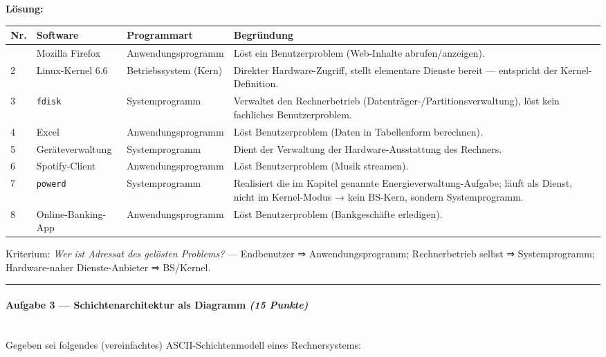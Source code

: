 \documentclass[11pt, a4paper]{article}
\begin{document}
\textbf{Lösung:}



{\small
\begin{tabularx}{\linewidth}{XXXX}
\hline
\rowcolor{tableheadbg}
{\color{white}\textbf{Nr.}} & {\color{white}\textbf{Software}} & {\color{white}\textbf{Programmart}} & {\color{white}\textbf{Begründung}} \\[2pt]
\hline
\endhead
\hline
\endfoot
1 & Mozilla Firefox & Anwendungsprogramm & Löst ein Benutzerproblem (Web-Inhalte abrufen/anzeigen). \\
2 & Linux-Kernel 6.6 & Betriebssystem (Kern) & Direkter Hardware-Zugriff, stellt elementare Dienste bereit — entspricht der Kernel-Definition. \\
3 & \texttt{fdisk} & Systemprogramm & Verwaltet den Rechnerbetrieb (Datenträger-/Partitionsverwaltung), löst kein fachliches Benutzerproblem. \\
4 & Excel & Anwendungsprogramm & Löst Benutzerproblem (Daten in Tabellenform berechnen). \\
5 & Geräteverwaltung & Systemprogramm & Dient der Verwaltung der Hardware-Ausstattung des Rechners. \\
6 & Spotify-Client & Anwendungsprogramm & Löst Benutzerproblem (Musik streamen). \\
7 & \texttt{powerd} & Systemprogramm & Realisiert die im Kapitel genannte Energieverwaltung-Aufgabe; läuft als Dienst, nicht im Kernel-Modus → kein BS-Kern, sondern Systemprogramm. \\
8 & Online-Banking-App & Anwendungsprogramm & Löst Benutzerproblem (Bankgeschäfte erledigen). \\
\end{tabularx}
}


Kriterium: \textit{Wer ist Adressat des gelösten Problems?} — Endbenutzer ⇒ Anwendungsprogramm; Rechnerbetrieb selbst ⇒ Systemprogramm; Hardware-naher Dienste-Anbieter ⇒ BS/Kernel.



\noindent\textcolor{rulegray}{\rule{\linewidth}{0.4pt}}


\paragraph{Aufgabe 3 — Schichtenarchitektur als Diagramm \textit{(15 Punkte)}}\mbox{}\\[2pt]

Gegeben sei folgendes (vereinfachtes) ASCII-Schichtenmodell eines Rechnersystems:
\end{document}
